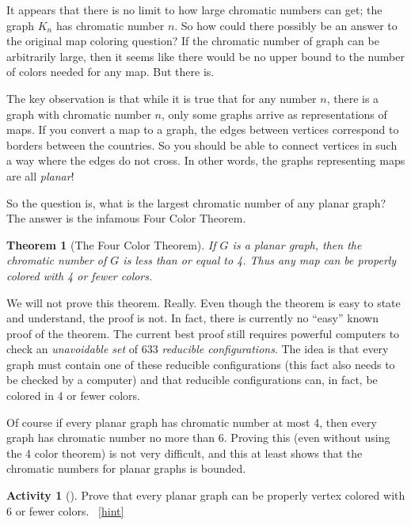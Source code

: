 \documentclass[10pt,]{book}
\theoremstyle{plain}
\newtheorem{theorem}{Theorem}[section]
\theoremstyle{definition}
\theoremstyle{definition}
\theoremstyle{definition}
\newtheorem{activity}[project]{Activity}
\numberwithin{equation}{chapter}
\begin{document}
\hypertarget{p-346}{}%
It appears that there is no limit to how large chromatic numbers can get; the graph \(K_n\) has chromatic number \(n\). So how could there possibly be an answer to the original map coloring question? If the chromatic number of graph can be arbitrarily large, then it seems like there would be no upper bound to the number of colors needed for any map. But there is.%
\par
\hypertarget{p-347}{}%
The key observation is that while it is true that for any number \(n\), there is a graph with chromatic number \(n\), only some graphs arrive as representations of maps. If you convert a map to a graph, the edges between vertices correspond to borders between the countries. So you should be able to connect vertices in such a way where the edges do not cross. In other words, the graphs representing maps are all \emph{planar}!%
\par
\hypertarget{p-348}{}%
So the question is, what is the largest chromatic number of any planar graph? The answer is the infamous Four Color Theorem.%
\begin{theorem}[{The Four Color Theorem}]\label{theorem-5}
\hypertarget{p-349}{}%
 If \(G\) is a planar graph, then the chromatic number of \(G\) is less than or equal to 4. Thus any map can be properly colored with 4 or fewer colors.%
\end{theorem}
\hypertarget{p-350}{}%
We will not prove this theorem. Really. Even though the theorem is easy to state and understand, the proof is not. In fact, there is currently no ``easy'' known proof of the theorem. The current best proof still requires powerful computers to check an \emph{unavoidable set} of 633 \emph{reducible configurations}. The idea is that every graph must contain one of these reducible configurations (this fact also needs to be checked by a computer) and that reducible configurations can, in fact, be colored in 4 or fewer colors.%
\par
\hypertarget{p-351}{}%
Of course if every planar graph has chromatic number at most 4, then every graph has chromatic number no more than 6.  Proving this (even without using the 4 color theorem) is not very difficult, and this at least shows that the chromatic numbers for planar graphs is bounded.%
\begin{activity}[]\label{activity-31}
\hypertarget{p-352}{}%
Prove that every planar graph can be properly vertex colored with 6 or fewer colors.%
~\hfill{\tiny\hyperlink{a-38}{[hint]}\hypertarget{q-38}{}}\end{activity}
\end{document}
